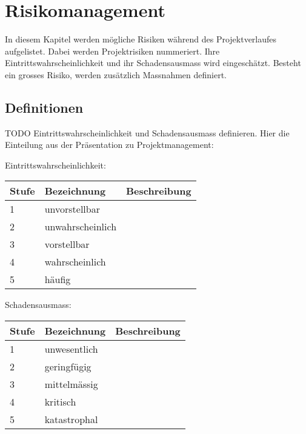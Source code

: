 \documentclass[a4paper]{report}
\begin{document}
\chapter{Risikomanagement}
In diesem Kapitel werden mögliche Risiken während des Projektverlaufes aufgelistet. Dabei werden Projektrisiken nummeriert. Ihre Eintrittswahrscheinlichkeit und ihr Schadensausmass wird eingeschätzt. Besteht ein grosses Risiko, werden zusätzlich Massnahmen definiert. 

\section{Definitionen}
TODO Eintrittswahrscheinlichkeit und Schadensausmass definieren. Hier die Einteilung aus der Präsentation zu  Projektmanagement:

\vspace{1em}
\noindent
Eintrittswahrscheinlichkeit: 

\vspace{1em}
\noindent
\begin{tabular}{|l|l|l|}
	\hline
	\textbf{Stufe} & \textbf{Bezeichnung} & \textbf{Beschreibung} \\
	\hline
	1 & unvorstellbar & \\
	\hline
	2 & unwahrscheinlich & \\
	\hline
	3 & vorstellbar & \\
	\hline
	4 & wahrscheinlich & \\
	\hline
	5 & häufig & \\
	\hline
\end{tabular}

\vspace{1em}
\noindent
Schadensausmass:

\vspace{1em}
\noindent
\begin{tabular}{|l|l|l|}
	\hline
	\textbf{Stufe} & \textbf{Bezeichnung} & \textbf{Beschreibung} \\
	\hline
	1 & unwesentlich & \\
	\hline
	2 & geringfügig & \\
	\hline
	3 & mittelmässig & \\
	\hline
	4 & kritisch & \\
	\hline
	5 & katastrophal & \\
	\hline
\end{tabular}
	
\end{document}
